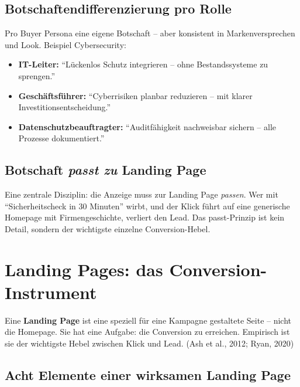 \documentclass[11pt,a4paper,oneside]{article}
\newcommand{\fachbegriff}[1]{\textbf{#1}}
\newcommand{\quelle}[1]{{\footnotesize\color{lpGray}(#1)}}
\begin{document}
\subsection{Botschaftendifferenzierung pro Rolle}

Pro Buyer Persona eine eigene Botschaft -- aber konsistent in Markenversprechen und Look. Beispiel Cybersecurity:

\begin{itemize}
  \item \textbf{IT-Leiter:} ``Lückenlos Schutz integrieren -- ohne Bestandssysteme zu sprengen.''
  \item \textbf{Geschäftsführer:} ``Cyberrisiken planbar reduzieren -- mit klarer Investitionsentscheidung.''
  \item \textbf{Datenschutzbeauftragter:} ``Auditfähigkeit nachweisbar sichern -- alle Prozesse dokumentiert.''
\end{itemize}

\subsection{Botschaft \emph{passt zu} Landing Page}

Eine zentrale Disziplin: die Anzeige muss zur Landing Page \emph{passen}. Wer mit ``Sicherheitscheck in 30 Minuten'' wirbt, und der Klick führt auf eine generische Homepage mit Firmengeschichte, verliert den Lead. Das passt-Prinzip ist kein Detail, sondern der wichtigste einzelne Conversion-Hebel.

\section{Landing Pages: das Conversion-Instrument}

Eine \fachbegriff{Landing Page} ist eine speziell für eine Kampagne gestaltete Seite -- nicht die Homepage. Sie hat eine Aufgabe: die Conversion zu erreichen. Empirisch ist sie der wichtigste Hebel zwischen Klick und Lead. \quelle{Ash et al., 2012; Ryan, 2020}

\subsection{Acht Elemente einer wirksamen Landing Page}
\end{document}
